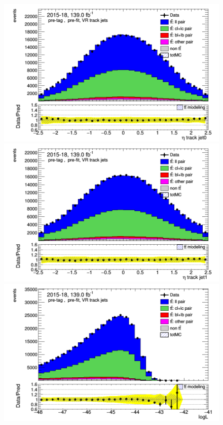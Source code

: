 \documentclass[letterpaper,12pt]{article}
\begin{document}
\begin{figure}
\begin{minipage}[b]{.45\textwidth}
\centering
\includegraphics[width=1\textwidth]{Oct_distributions/pretagNoRwDL1rwithhighpTVRJets_scaledall/DataMC_J0_eta.png}
\end{minipage}\hfill
\begin{minipage}[b]{.45\textwidth}
\centering
\includegraphics[width=1\textwidth]{Oct_distributions/pretagNoRwDL1rwithhighpTVRJets_scaledall/DataMC_J1_eta.png}
\end{minipage}\hfill
\begin{minipage}[b]{.45\textwidth}
\centering
\includegraphics[width=1\textwidth]{Oct_distributions/pretagNoRwDL1rwithhighpTVRJets_scaledall/DataMC_LLR.png}

\end{minipage}
\end{figure}
\end{document}
